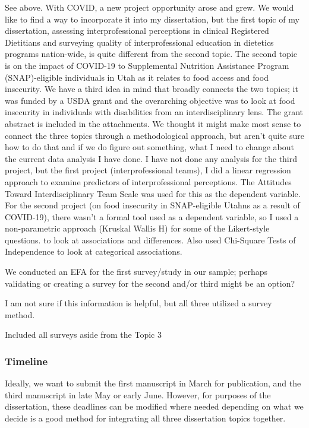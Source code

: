 \documentclass[
]{article}
\begin{document}
See above. With COVID, a new project opportunity arose and grew. We
would like to find a way to incorporate it into my dissertation, but the
first topic of my dissertation, assessing interprofessional perceptions
in clinical Registered Dietitians and surveying quality of
interprofessional education in dietetics programs nation-wide, is quite
different from the second topic. The second topic is on the impact of
COVID-19 to Supplemental Nutrition Assistance Program (SNAP)-eligible
individuals in Utah as it relates to food access and food insecurity. We
have a third idea in mind that broadly connects the two topics; it was
funded by a USDA grant and the overarching objective was to look at food
insecurity in individuals with disabilities from an interdisciplinary
lens. The grant abstract is included in the attachments. We thought it
might make most sense to connect the three topics through a
methodological approach, but aren't quite sure how to do that and if we
do figure out something, what I need to change about the current data
analysis I have done. I have not done any analysis for the third
project, but the first project (interprofessional teams), I did a linear
regression approach to examine predictors of interprofessional
perceptions. The Attitudes Toward Interdisciplinary Team Scale was used
for this as the dependent variable. For the second project (on food
insecurity in SNAP-eligible Utahns as a result of COVID-19), there
wasn't a formal tool used as a dependent variable, so I used a
non-parametric approach (Kruskal Wallis H) for some of the Likert-style
questions. to look at associations and differences. Also used Chi-Square
Tests of Independence to look at categorical associations.

We conducted an EFA for the first survey/study in our sample; perhaps
validating or creating a survey for the second and/or third might be an
option?

I am not sure if this information is helpful, but all three utilized a
survey method.

Included all surveys aside from the Topic 3

\hypertarget{timeline}{%
\subsubsection{Timeline}\label{timeline}}

Ideally, we want to submit the first manuscript in March for
publication, and the third manuscript in late May or early June.
However, for purposes of the dissertation, these deadlines can be
modified where needed depending on what we decide is a good method for
integrating all three dissertation topics together.
\end{document}

